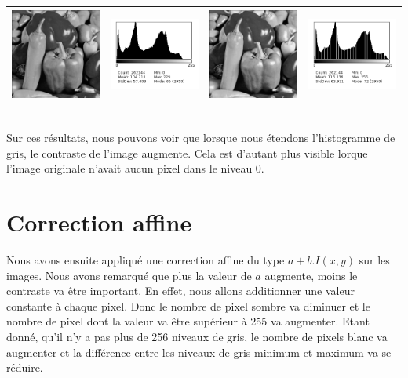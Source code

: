 \documentclass[a4paper,11pt]{article}
\begin{document}
\begin{tabular}{|c|c|c|c|}
   \hline
   \includegraphics[width=3cm]{peppers.png} & \includegraphics[width=3cm]{../histo/image/hist_peppers.png} & \includegraphics[width=3cm]{../res/peppersQ1.png} & \includegraphics[width=3cm]{../histo/resultat/hist_peppersQ1.png}\\
   \hline
  \end{tabular}\\
  
  Sur ces résultats, nous pouvons voir que lorsque nous étendons l'histogramme de gris, le contraste de l'image augmente. Cela
  est d'autant plus visible lorque l'image originale n'avait aucun pixel dans le niveau 0.
  
  \section{Correction affine}
  Nous avons ensuite appliqué une correction affine du type $a+b.I(x,y)$ sur les images.
  Nous avons remarqué que plus la valeur de $a$ augmente, moins le contraste va être important.
  En effet, nous allons additionner une valeur constante à chaque pixel. Donc le nombre de pixel
  sombre va diminuer et le nombre de pixel dont la valeur va être supérieur à 255 va augmenter.
  Etant donné, qu'il n'y a pas plus de 256 niveaux de gris, le nombre de pixels blanc va augmenter
  et la différence entre les niveaux de gris minimum et maximum va se réduire.\\
  
\end{document}
